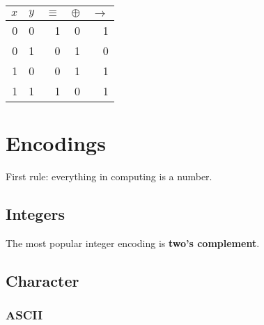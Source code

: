 \documentclass[12pt]{book}
\begin{document}
  \begin{center}
    \begin{tabular}{r r | r | r | r}
      $x$ & $y$ & $\equiv$ & $\oplus$ & $\to$ \\
      \hline
        0 &   0 &        1 &        0 &     1 \\
        0 &   1 &        0 &        1 &     0 \\
        1 &   0 &        0 &        1 &     1 \\
        1 &   1 &        1 &        0 &     1 \\
    \end{tabular}
  \end{center}

  \chapter{Encodings}

  First rule: everything in computing is a number.

  \newpage
  \section{Integers}

  The most popular integer encoding is \textbf{two's complement}.

  \newpage
  \section{Character}

  \subsection{ASCII}
\end{document}
